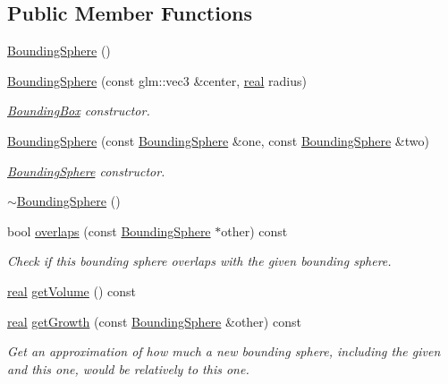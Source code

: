 \subsection*{Public Member Functions}
\begin{DoxyCompactItemize}
\item 
\mbox{\hyperlink{classr3_1_1_bounding_sphere_af602a853d8ed0b5ccad8679ee41fe7f8}{Bounding\+Sphere}} ()
\item 
\mbox{\hyperlink{classr3_1_1_bounding_sphere_a9a9264c19d56b10c9b0def547a369d57}{Bounding\+Sphere}} (const glm\+::vec3 \&center, \mbox{\hyperlink{namespacer3_ab2016b3e3f743fb735afce242f0dc1eb}{real}} radius)
\begin{DoxyCompactList}\small\item\em \mbox{\hyperlink{classr3_1_1_bounding_box}{Bounding\+Box}} constructor. \end{DoxyCompactList}\item 
\mbox{\hyperlink{classr3_1_1_bounding_sphere_a3d461e62b827ad9a30ca8013d451e3da}{Bounding\+Sphere}} (const \mbox{\hyperlink{classr3_1_1_bounding_sphere}{Bounding\+Sphere}} \&one, const \mbox{\hyperlink{classr3_1_1_bounding_sphere}{Bounding\+Sphere}} \&two)
\begin{DoxyCompactList}\small\item\em \mbox{\hyperlink{classr3_1_1_bounding_sphere}{Bounding\+Sphere}} constructor. \end{DoxyCompactList}\item 
\mbox{\hyperlink{classr3_1_1_bounding_sphere_a9951f8922ebb2227cd97e59c97fed2a5}{$\sim$\+Bounding\+Sphere}} ()
\item 
bool \mbox{\hyperlink{classr3_1_1_bounding_sphere_a49163c78b0d1318c576d99e61f806ac2}{overlaps}} (const \mbox{\hyperlink{classr3_1_1_bounding_sphere}{Bounding\+Sphere}} $\ast$other) const
\begin{DoxyCompactList}\small\item\em Check if this bounding sphere overlaps with the given bounding sphere. \end{DoxyCompactList}\item 
\mbox{\hyperlink{namespacer3_ab2016b3e3f743fb735afce242f0dc1eb}{real}} \mbox{\hyperlink{classr3_1_1_bounding_sphere_a01cc1a7397eeec86d2b074d2bf734798}{get\+Volume}} () const
\item 
\mbox{\hyperlink{namespacer3_ab2016b3e3f743fb735afce242f0dc1eb}{real}} \mbox{\hyperlink{classr3_1_1_bounding_sphere_ac13a86be56c1c52b33a707eb2356daa3}{get\+Growth}} (const \mbox{\hyperlink{classr3_1_1_bounding_sphere}{Bounding\+Sphere}} \&other) const
\begin{DoxyCompactList}\small\item\em Get an approximation of how much a new bounding sphere, including the given and this one, would be relatively to this one. \end{DoxyCompactList}\end{DoxyCompactItemize}
